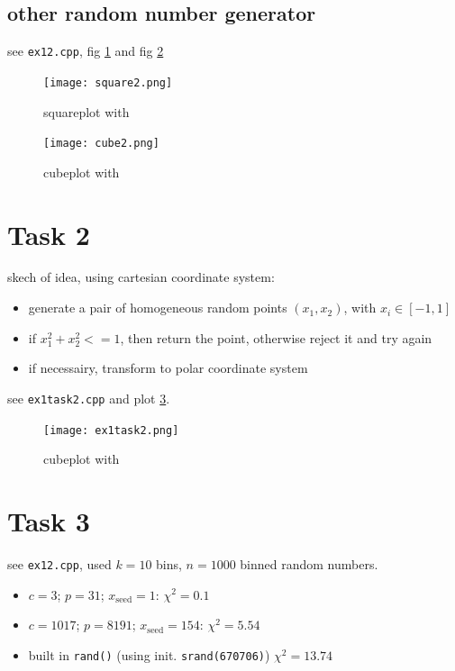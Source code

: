 \subsection{other random number generator}
see \verb|ex12.cpp|, fig \ref{fig:square2} and fig \ref{fig:cube2}

\begin{figure}[b]
  \centering
  \texttt{[image: square2.png]}
  \caption{squareplot with }
  \label{fig:square2}
\end{figure}

\begin{figure}[b]
  \centering
  \texttt{[image: cube2.png]}
  \caption{cubeplot with }
  \label{fig:cube2}
\end{figure}


\section{Task 2}
skech of idea, using cartesian coordinate system:
\begin{itemize}
  \item generate a pair of homogeneous random points $(x_1,x_2)$, with $x_i \in [-1,1]$
  \item if $x_1^2 + x_2^2<=1$, then return the point, otherwise reject it and try again
  \item if necessairy, transform to polar coordinate system
\end{itemize}
see \verb|ex1task2.cpp| and plot \ref{fig:ex1task2}.

\begin{figure}[b]
  \centering
  \texttt{[image: ex1task2.png]}
  \caption{cubeplot with }
  \label{fig:ex1task2}
\end{figure}


\section{Task 3}
see \verb|ex12.cpp|, used $k=10$ bins, $n=1000$ binned random numbers.
\begin{itemize}
  \item $c = 3$; $p = 31$; $x_\mathrm{seed} = 1$: $\chi^2 = 0.1$
  \item $c = 1017$; $p = 8191$; $x_\mathrm{seed} = 154$: $\chi^2 = 5.54$
  \item built in \verb|rand()| (using init. \verb|srand(670706)|) $\chi^2 = 13.74$
\end{itemize}
